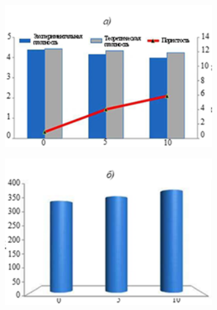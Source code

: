 \begin{figure}[H]
	\centering
	\includegraphics[width=0.8\textwidth]{media/chem2/image6}
	\caption*{}
\end{figure}

\begin{figure}[H]
	\centering
	\includegraphics[width=0.8\textwidth]{media/chem2/image7}
	\caption*{}
\end{figure}

